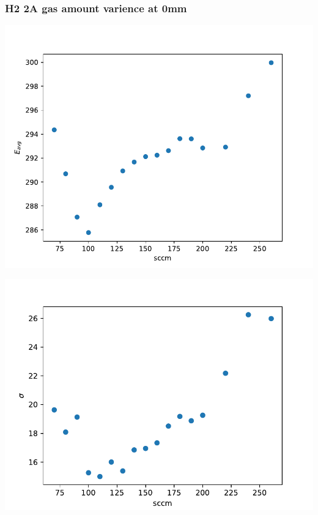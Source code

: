 \documentclass{beamer} %
\begin{document}
\begin{frame}
    \frametitle{H2 2A gas amount varience at 0mm}
    \begin{minipage}{0.49\textwidth}
        \includegraphics[width=1.1\textwidth]{figures/Gasvary_H2_2A_Energy.pdf}
    \end{minipage}
    \begin{minipage}{0.49\textwidth}
        \includegraphics[width=1.1\textwidth]{figures/Gasvary_H2_2A_Energy_sigma.pdf}
    \end{minipage}
    \begin{minipage}{0.49\textwidth}

\end{minipage}
\end{frame}
\end{document}
